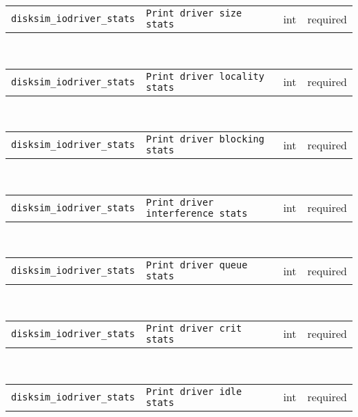 \noindent 
\begin{tabular}{|p{\lpmodwidth}|p{\lpnamewidth}|p{0.5in}|p{0.5in}|}
\cline{1-4}
\texttt{disksim\_iodriver\_stats} & \texttt{Print driver size stats} & int & required \\ 
\cline{1-4}
\end{tabular}\\ 
\noindent 
\begin{tabular}{|p{\lpmodwidth}|p{\lpnamewidth}|p{0.5in}|p{0.5in}|}
\cline{1-4}
\texttt{disksim\_iodriver\_stats} & \texttt{Print driver locality stats} & int & required \\ 
\cline{1-4}
\end{tabular}\\ 
\noindent 
\begin{tabular}{|p{\lpmodwidth}|p{\lpnamewidth}|p{0.5in}|p{0.5in}|}
\cline{1-4}
\texttt{disksim\_iodriver\_stats} & \texttt{Print driver blocking stats} & int & required \\ 
\cline{1-4}
\end{tabular}\\ 
\noindent 
\begin{tabular}{|p{\lpmodwidth}|p{\lpnamewidth}|p{0.5in}|p{0.5in}|}
\cline{1-4}
\texttt{disksim\_iodriver\_stats} & \texttt{Print driver interference stats} & int & required \\ 
\cline{1-4}
\end{tabular}\\ 
\noindent 
\begin{tabular}{|p{\lpmodwidth}|p{\lpnamewidth}|p{0.5in}|p{0.5in}|}
\cline{1-4}
\texttt{disksim\_iodriver\_stats} & \texttt{Print driver queue stats} & int & required \\ 
\cline{1-4}
\end{tabular}\\ 
\noindent 
\begin{tabular}{|p{\lpmodwidth}|p{\lpnamewidth}|p{0.5in}|p{0.5in}|}
\cline{1-4}
\texttt{disksim\_iodriver\_stats} & \texttt{Print driver crit stats} & int & required \\ 
\cline{1-4}
\end{tabular}\\ 
\noindent 
\begin{tabular}{|p{\lpmodwidth}|p{\lpnamewidth}|p{0.5in}|p{0.5in}|}
\cline{1-4}
\texttt{disksim\_iodriver\_stats} & \texttt{Print driver idle stats} & int & required \\ 
\cline{1-4}
\end{tabular}\\ 
